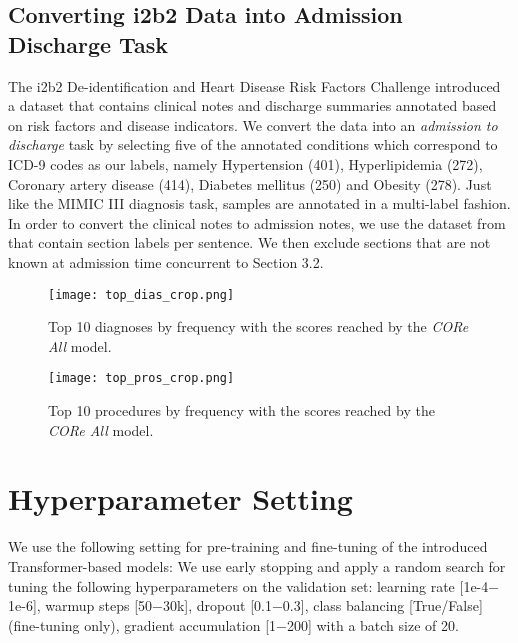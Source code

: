 \documentclass[11pt,a4paper]{article}
\begin{document}
\subsection{Converting i2b2 Data into Admission Discharge Task}
\label{app:i2b2-prep}
The i2b2 De-identification and Heart Disease Risk Factors Challenge \cite{i2b2-2014,i2b2-2014-2} introduced a dataset that contains clinical notes and discharge summaries annotated based on risk factors and disease indicators. We convert the data into an \textit{admission to discharge} task by selecting five of the annotated conditions which correspond to ICD-9 codes as our labels, namely Hypertension (401), Hyperlipidemia (272), Coronary artery disease (414), Diabetes mellitus (250) and Obesity (278). Just like the MIMIC III diagnosis task, samples are annotated in a multi-label fashion.
In order to convert the clinical notes to admission notes, we use the dataset from \citet{i2b2-section-prediction} that contain section labels per sentence. We then exclude sections that are not known at admission time concurrent to Section 3.2.

\begin{figure}[t!]
  \centering
  \texttt{[image: top\_dias\_crop.png]}
  \caption{Top 10 diagnoses by frequency with the scores reached by the \textit{CORe All} model.}
\label{fig:top_dia}
\end{figure}

\begin{figure}[t!]
  \centering
  \texttt{[image: top\_pros\_crop.png]}
  \caption{Top 10 procedures by frequency with the scores reached by the \textit{CORe All} model.}
\label{fig:top_pro}
\end{figure}

\section{Hyperparameter Setting}
\label{app:hyperparameter}
We use the following setting for pre-training and fine-tuning of the introduced Transformer-based models:
We use early stopping and apply a random search for tuning the following hyperparameters on the validation set: learning rate [1e-4$-$1e-6], warmup steps [50$-$30k], dropout [0.1$-$0.3], class balancing [True/False] (fine-tuning only), gradient accumulation [1$-$200] with a batch size of 20.
\end{document}
